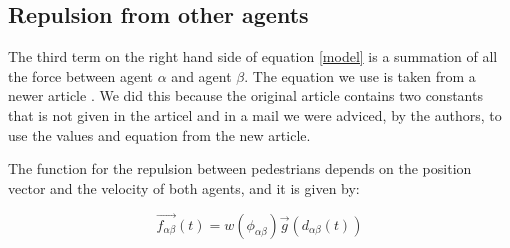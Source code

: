 

\subsection{Repulsion from other agents}
The third term on the right hand side of equation \eqref{model} is a summation of all the 
force between agent $\alpha$ and agent $\beta$. The equation we use is taken from a newer article \cite{ABconstant}. We did this because the original article contains two constants that is not given in the articel and in a mail we were adviced, by the authors, to use the values and equation from the new article. 

The function for the repulsion between pedestrians depends on the position vector and the velocity of 
both agents, and it is given by:

\begin{equation}
        \vec{f_{\alpha \beta }}\left( t \right) = w\left(\phi_{\alpha \beta}\right)\vec{g}\left(d_{\alpha \beta}(t)\right)
    \label{eq:agentinteraction}
\end{equation}

